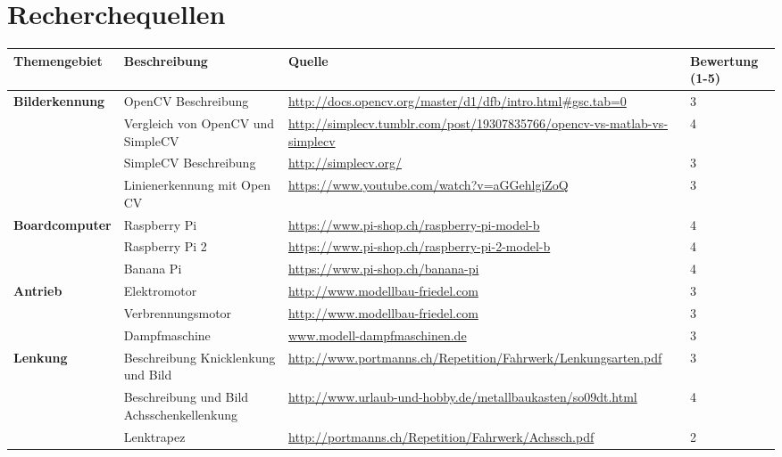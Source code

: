 \section{Recherchequellen}


\begin{table}[h]
\begin{tabular}{|p{3cm}|p{3.5cm}|p{5cm}|p{2cm}|}\hline
	
	\textbf{Themengebiet}	& 	\textbf{Beschreibung} & \textbf{Quelle} & \textbf{Bewertung (1-5)} \\\hline
	
	
	\textbf{Bilderkennung}	&	OpenCV Beschreibung	&	\url{http://docs.opencv.org/master/d1/dfb/intro.html#gsc.tab=0}	&	3 \\\hline
				 			&	Vergleich von OpenCV und SimpleCV	&	\url{http://simplecv.tumblr.com/post/19307835766/opencv-vs-matlab-vs-simplecv}	&	4 \\\hline
				 			&	SimpleCV Beschreibung	&	\url{http://simplecv.org/}	&	3 \\\hline
				 			&	Linienerkennung mit Open CV	&	\url{https://www.youtube.com/watch?v=aGGehlgiZoQ}	&	3	\\\hline
				 			
\textbf{Boardcomputer}	& 	Raspberry Pi & \url{https://www.pi-shop.ch/raspberry-pi-model-b} & 4 \\\hline
						& 	Raspberry Pi 2 & \url{https://www.pi-shop.ch/raspberry-pi-2-model-b} & 4 \\\hline
						& 	Banana Pi & \url{https://www.pi-shop.ch/banana-pi} & 4 \\\hline	
						
\textbf{Antrieb}	& 	Elektromotor & \url{http://www.modellbau-friedel.com} & 3 \\\hline
					& 	Verbrennungsmotor & \url{http://www.modellbau-friedel.com} & 3 \\\hline
					& 	Dampfmaschine & \url{www.modell-dampfmaschinen.de} & 3 \\\hline
					
\textbf{Lenkung} &  Beschreibung Knicklenkung und Bild & \url{http://www.portmanns.ch/Repetition/Fahrwerk/Lenkungsarten.pdf} & 3 \\\hline

& Beschreibung und Bild Achsschenkellenkung & \url{http://www.urlaub-und-hobby.de/metallbaukasten/so09dt.html} & 4 \\\hline 

& Lenktrapez & \url{http://portmanns.ch/Repetition/Fahrwerk/Achssch.pdf} & 2 \\\hline 


\end{tabular}
\end{table}
